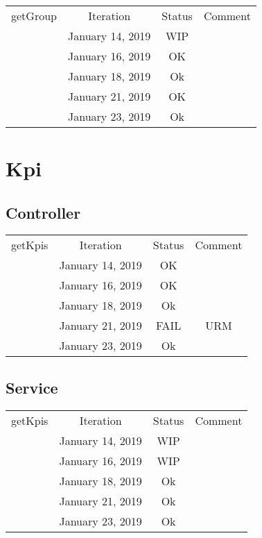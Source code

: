 \documentclass{scrreprt}
\begin{document}
\\ \\ \\
\begin{tabularx}{12cm}{X|c|c|c}
	getGroup & Iteration & Status & Comment  \\
	& January 14, 2019 & WIP & \\
	& January 16, 2019 & OK & \\
	& January 18, 2019 & Ok & \\
	& January 21, 2019 & OK &  \\
	& January 23, 2019 & Ok & \\
\end{tabularx}

\section{Kpi}

\subsection{Controller}
	\begin{tabularx}{12cm}{X|c|c|c}
		getKpis & Iteration & Status & Comment  \\
		& January 14, 2019 & OK & \\
		& January 16, 2019 & OK & \\
		& January 18, 2019 & Ok & \\
		& January 21, 2019 & FAIL & URM \\
		& January 23, 2019 & Ok & \\
	\end{tabularx}	

\subsection{Service}
	\begin{tabularx}{12cm}{X|c|c|c}
		getKpis	& Iteration & Status & Comment  \\
		& January 14, 2019 & WIP & \\
		& January 16, 2019 & WIP & \\
		& January 18, 2019 & Ok & \\
		& January 21, 2019 & Ok & \\
		& January 23, 2019 & Ok & \\
	\end{tabularx}	
\end{document}
